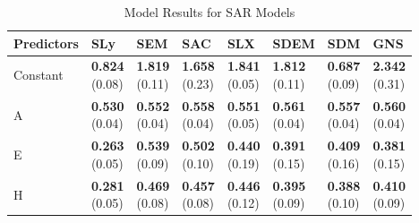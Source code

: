 \documentclass[lineno,pdflatex,sn-basic]{sn-jnl}%
\theoremstyle{thmstyleone}%
\theoremstyle{thmstyletwo}%
\theoremstyle{thmstylethree}%
\begin{document}
\begin{table}[ht]
\centering
\caption{Model Results for SAR Models} 
\label{tab:SAR}
\begin{tabular}{llllllll}
\toprule
 Predictors & SLy & SEM & SAC & SLX & SDEM & SDM & GNS \\
 \midrule
Constant & \makecell{\textbf{0.824} \\ (0.08)} & \makecell{\textbf{1.819} \\ (0.11)} & \makecell{\textbf{1.658} \\ (0.23)} & \makecell{\textbf{1.841} \\ (0.05)} & \makecell{\textbf{1.812} \\ (0.11)} & \makecell{\textbf{0.687} \\ (0.09)} & \makecell{\textbf{2.342} \\ (0.31)} \\
 A & \makecell{\textbf{0.530} \\ (0.04)} & \makecell{\textbf{0.552} \\ (0.04)} & \makecell{\textbf{0.558} \\ (0.04)} & \makecell{\textbf{0.551} \\ (0.05)} & \makecell{\textbf{0.561} \\ (0.04)} & \makecell{\textbf{0.557} \\ (0.04)} & \makecell{\textbf{0.560} \\ (0.04)} \\
 E & \makecell{\textbf{0.263} \\ (0.05)} & \makecell{\textbf{0.539} \\ (0.09)} & \makecell{\textbf{0.502} \\ (0.10)} & \makecell{\textbf{0.440} \\ (0.19)} & \makecell{\textbf{0.391} \\ (0.15)} & \makecell{\textbf{0.409} \\ (0.16)} & \makecell{\textbf{0.381} \\ (0.15)} \\
 H & \makecell{\textbf{0.281} \\ (0.05)} & \makecell{\textbf{0.469} \\ (0.08)} & \makecell{\textbf{0.457} \\ (0.08)} & \makecell{\textbf{0.446} \\ (0.12)} & \makecell{\textbf{0.395} \\ (0.09)} & \makecell{\textbf{0.388} \\ (0.10)} & \makecell{\textbf{0.410} \\ (0.09)} \\

\end{tabular}
\end{table}
\end{document}
